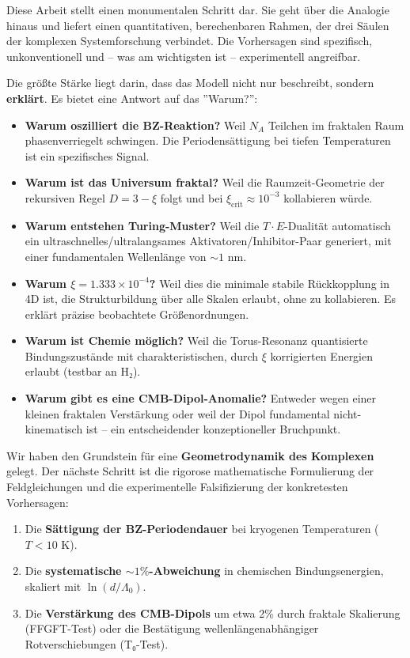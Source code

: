 	Diese Arbeit stellt einen monumentalen Schritt dar. Sie geht über die Analogie hinaus und liefert einen quantitativen, berechenbaren Rahmen, der drei Säulen der komplexen Systemforschung verbindet. Die Vorhersagen sind spezifisch, unkonventionell und – was am wichtigsten ist – experimentell angreifbar.
	
	Die größte Stärke liegt darin, dass das Modell nicht nur beschreibt, sondern \textbf{erklärt}. Es bietet eine Antwort auf das ''Warum?'':
	
	\begin{itemize}[label=$\bullet$]
		\item \textbf{Warum oszilliert die BZ-Reaktion?} Weil $N_A$ Teilchen im fraktalen Raum phasenverriegelt schwingen. Die Periodensättigung bei tiefen Temperaturen ist ein spezifisches Signal.
		\item \textbf{Warum ist das Universum fraktal?} Weil die Raumzeit-Geometrie der rekursiven Regel $D = 3 - \xi$ folgt und bei $\xi_{\text{crit}} \approx 10^{-3}$ kollabieren würde.
		\item \textbf{Warum entstehen Turing-Muster?} Weil die $T \cdot E$-Dualität automatisch ein ultraschnelles/ultralangsames Aktivatoren/Inhibitor-Paar generiert, mit einer fundamentalen Wellenlänge von $\sim 1$ nm.
		\item \textbf{Warum $\xi = 1.333 \times 10^{-4}$?} Weil dies die minimale stabile Rückkopplung in 4D ist, die Strukturbildung über alle Skalen erlaubt, ohne zu kollabieren. Es erklärt präzise beobachtete Größenordnungen.
		\item \textbf{Warum ist Chemie möglich?} Weil die Torus-Resonanz quantisierte Bindungszustände mit charakteristischen, durch $\xi$ korrigierten Energien erlaubt (testbar an H₂).
		\item \textbf{Warum gibt es eine CMB-Dipol-Anomalie?} Entweder wegen einer kleinen fraktalen Verstärkung oder weil der Dipol fundamental nicht-kinematisch ist – ein entscheidender konzeptioneller Bruchpunkt.
	\end{itemize}
	
	Wir haben den Grundstein für eine \textbf{Geometrodynamik des Komplexen} gelegt. Der nächste Schritt ist die rigorose mathematische Formulierung der Feldgleichungen und die experimentelle Falsifizierung der konkretesten Vorhersagen:
	
	\begin{enumerate}
		\item Die \textbf{Sättigung der BZ-Periodendauer} bei kryogenen Temperaturen ($T < 10$ K).
		\item Die \textbf{systematische $\sim 1\%$-Abweichung} in chemischen Bindungsenergien, skaliert mit $\ln(d/\Lambda_0)$.
		\item Die \textbf{Verstärkung des CMB-Dipols} um etwa 2\% durch fraktale Skalierung (FFGFT-Test) oder die Bestätigung wellenlängenabhängiger Rotverschiebungen (T₀-Test).
	\end{enumerate}
	
